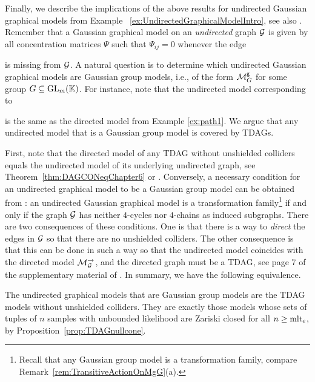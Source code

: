 Finally, we describe the implications of the above results for undirected Gaussian graphical models from Example ~\ref{ex:UndirectedGraphicalModelIntro}, see also \cite[Chapter 13]{SullivantBook}. Remember that a Gaussian graphical model on an \emph{undirected} graph $\mathcal{G}$ is given by all concentration matrices $\Psi$ such that $\Psi_{ij}=0$ whenever the edge
is missing from $\mathcal{G}$. A natural question is to determine which undirected Gaussian graphical models are Gaussian group models, i.e., of the form $\mathcal{M}^{\mathtt{g}}_G$ for some group $G \subseteq \operatorname{GL}_m(\mathbb K)$. For instance, note that the undirected model corresponding to 
is the same as the directed model from Example \ref{ex:path1}. We argue that any undirected model that is a Gaussian group model is covered by TDAGs.

First, note that the directed model of any TDAG without unshielded colliders equals the undirected model of its underlying undirected graph, see Theorem~\ref{thm:DAGCONeqChapter6}
or \cite[Theorem~3.1]{andersson1997markov}.
Conversely, a necessary condition for an undirected graphical model to be a Gaussian group model can be obtained from \cite[Theorem 2.2]{letac2007wishart}: an undirected Gaussian graphical model is a transformation family\footnote{Recall that any Gaussian group model is a transformation family, compare Remark~\ref{rem:TransitiveActionOnMgG}(a).} if and only if the graph $\mathcal{G}$ has neither $4$-cycles nor $4$-chains as induced subgraphs. There are two consequences of these conditions. One is that there is a way to \emph{direct} the edges in $\mathcal{G}$ so that there are no unshielded colliders.
The other consequence is that this can be done in such a way so that the undirected model coincides with the directed model $\mathcal{M}_{\mathcal{G}}^{\to}$, and the directed graph must be a TDAG, see page 7 of the supplementary material of \cite{draisma2013groups}.
In summary, we have the following equivalence.

\begin{remark}
	\label{rem:undirectedGraphs}
	The undirected graphical models that are Gaussian group models are the TDAG models without unshielded colliders. 
	They are exactly those models 
	whose sets of tuples of $n$ samples with unbounded likelihood are Zariski closed for all $n \geq \operatorname{mlt}_e$,
	by Proposition~\ref{prop:TDAGnullcone}.
	\hfill\remSymbol
\end{remark}


